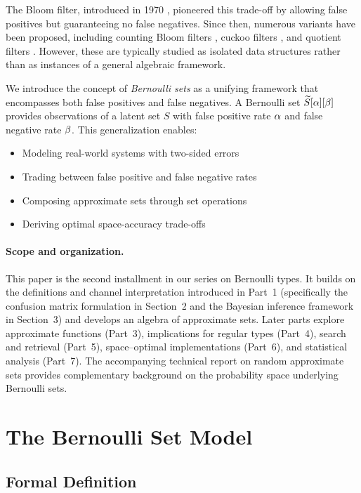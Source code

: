 \documentclass[11pt,final,hidelinks]{article}
\begin{document}
The Bloom filter, introduced in 1970 \cite{bloom1970}, pioneered this trade-off by allowing false positives but guaranteeing no false negatives. Since then, numerous variants have been proposed, including counting Bloom filters \cite{fan2000}, cuckoo filters \cite{fan2014}, and quotient filters \cite{bender2012}. However, these are typically studied as isolated data structures rather than as instances of a general algebraic framework.

We introduce the concept of \emph{Bernoulli sets} as a unifying framework that encompasses both false positives and false negatives. A Bernoulli set $\widetilde{S}[\alpha][\beta]$ provides observations of a latent set $S$ with false positive rate $\alpha$ and false negative rate $\beta$. This generalization enables:

\begin{itemize}
    \item Modeling real-world systems with two-sided errors
    \item Trading between false positive and false negative rates
    \item Composing approximate sets through set operations
    \item Deriving optimal space-accuracy trade-offs
\end{itemize}

\paragraph{Scope and organization.}  This paper is the second installment in our series on Bernoulli types.  It builds on the definitions and channel interpretation introduced in Part~1 (specifically the confusion matrix formulation in Section~2 and the Bayesian inference framework in Section~3) and develops an algebra of approximate sets.  Later parts explore approximate functions (Part~3), implications for regular types (Part~4), search and retrieval (Part~5), space–optimal implementations (Part~6), and statistical analysis (Part~7).  The accompanying technical report on random approximate sets provides complementary background on the probability space underlying Bernoulli sets.

\section{The Bernoulli Set Model}

\subsection{Formal Definition}
\end{document}
